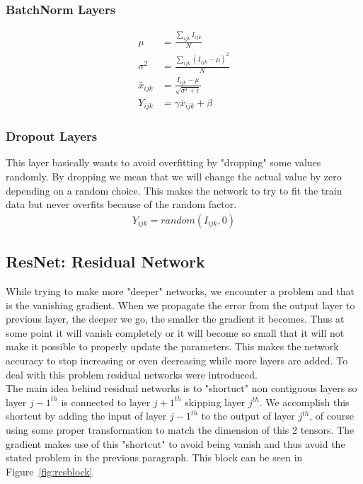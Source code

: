 \documentclass[english,preprint,JIP]{ipsj}
\begin{document}
\subsubsection{BatchNorm Layers}

\begin{align}
    \mu           & = \frac{\sum_{ijk} I_{ijk}}{N}                     \\
    \sigma^2      & = \frac{\sum_{ijk} (I_{ijk} - \mu)^2}{N}           \\
    \bar{x}_{ijk} & = \frac{I_{ijk} - \mu}{\sqrt{\sigma^2 + \epsilon}} \\
    Y_{ijk}       & = \gamma \bar{x}_{ijk} + \beta
\end{align}

\subsubsection{Dropout Layers}
This layer basically wants to avoid overfitting by "dropping" some values
randomly. By dropping we mean that we will change the actual value by zero
depending on a random choice. This makes the network to try to fit the train
data but never overfits because of the random factor.
\begin{align}
    Y_{ijk} = random(I_{ijk},0)
\end{align}

\subsection{ResNet: Residual Network}
While trying to make more "deeper" networks, we encounter a problem and that is
the vanishing gradient. When we propagate the error from the output layer to
previous layer, the deeper we go, the smaller the gradient it becomes. Thus at
some point it will vanish completely or it will become so small that it will not
make it possible to properly update the parameters. This makes the network
accuracy to stop increasing or even decreasing while more layers are added. To
deal with this problem residual networks were introduced.\\

The main idea behind residual networks is to "shortuct" non contiguous layers so
layer $j-1^{th}$ is connected to layer $j+1^{th}$ skipping layer $j^{th}$. We
accomplish this shortcut by adding the input of layer $j-1^{th}$ to the output
of layer $j^{th}$, of course using some proper transformation to match the
dimension of this 2 tensors. The gradient makes use of this "shortcut" to avoid
being vanish and thus avoid the stated problem in the previous paragraph. This
block can be seen in Figure~\ref{fig:resblock}
\end{document}
